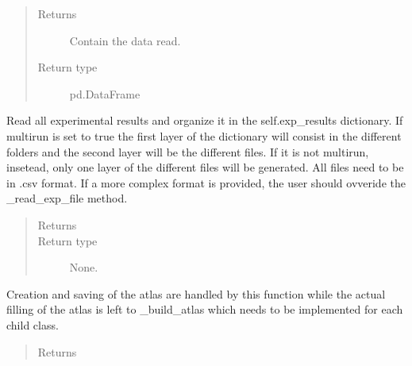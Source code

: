 \documentclass[letterpaper,10pt,english]{sphinxmanual}
\begin{document}
\begin{fulllineitems}
\begin{fulllineitems}
\begin{quote}
\begin{description}
\item[{Returns}] \leavevmode
\sphinxAtStartPar
Contain the data read.

\item[{Return type}] \leavevmode
\sphinxAtStartPar
pd.DataFrame

\end{description}\end{quote}

\end{fulllineitems}


\begin{fulllineitems}
\label{\detokenize{api/postprocessing:expoutput.ExperimentalOutput._read_exp_results}}
\sphinxAtStartPar
Read all experimental results and organize it in the self.exp\_results
dictionary.
If multirun is set to true the first layer of the dictionary will
consist in the different folders and the second layer will be the
different files. If it is not multirun, insetead, only one layer of the
different files will be generated.
All files need to be in .csv format. If a more complex format is
provided, the user should ovveride the \_read\_exp\_file method.
\begin{quote}\begin{description}
\item[{Returns}] \leavevmode
\sphinxAtStartPar


\item[{Return type}] \leavevmode
\sphinxAtStartPar
None.

\end{description}\end{quote}

\end{fulllineitems}


\begin{fulllineitems}
\label{\detokenize{api/postprocessing:expoutput.ExperimentalOutput.build_atlas}}
\sphinxAtStartPar
Creation and saving of the atlas are handled by this function while
the actual filling of the atlas is left to \_build\_atlas which needs
to be implemented for each child class.
\begin{quote}\begin{description}
\item[{Returns}] \leavevmode
\sphinxAtStartPar



\end{description}
\end{quote}
\end{fulllineitems}
\end{fulllineitems}
\end{document}
